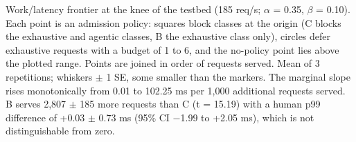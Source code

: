 Work/latency frontier at the knee of the testbed (185 req/s; $\alpha$ = 0.35, $\beta$ = 0.10). Each point is an admission policy: squares block classes at the origin (C blocks the exhaustive and agentic classes, B the exhaustive class only), circles defer exhaustive requests with a budget of 1 to 6, and the no-policy point lies above the plotted range. Points are joined in order of requests served. Mean of 3 repetitions; whiskers $\pm$ 1 SE, some smaller than the markers. The marginal slope rises monotonically from 0.01 to 102.25 ms per 1,000 additional requests served. B serves 2,807 $\pm$ 185 more requests than C (t = 15.19) with a human p99 difference of +0.03 $\pm$ 0.73 ms (95\% CI $-$1.99 to +2.05 ms), which is not distinguishable from zero.
